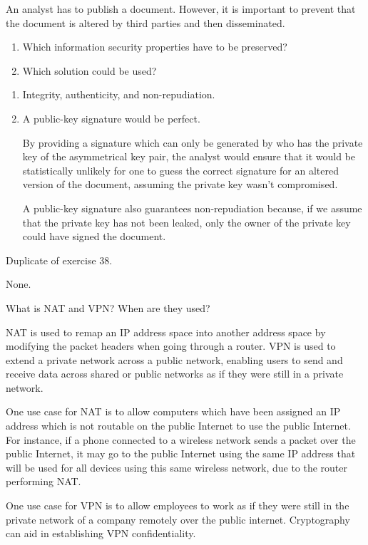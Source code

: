 \begin{Exercise}
An analyst has to publish a document.
However, it is important to prevent that the document is altered by third parties and then disseminated.
\begin{enumerate}
\item Which information security properties have to be preserved?
\item Which solution could be used?
\end{enumerate}
\end{Exercise}
\begin{Answer}
\begin{enumerate}
\item Integrity, authenticity, and non-repudiation.
\item A public-key signature would be perfect.

By providing a signature which can only be generated by who has the private key of the asymmetrical key pair, the analyst would ensure that it would be statistically unlikely for one to guess the correct signature for an altered version of the document, assuming the private key wasn't compromised.

A public-key signature also guarantees non-repudiation because, if we assume that the private key has not been leaked, only the owner of the private key could have signed the document.
\end{enumerate}
\end{Answer}

\begin{Exercise}
Duplicate of exercise 38.
\end{Exercise}
\begin{Answer}
None.
\end{Answer}

\begin{Exercise}
What is NAT and VPN? When are they used?
\end{Exercise}
\begin{Answer}
NAT is used to remap an IP address space into another address space by modifying the packet headers when going through a router.
VPN is used to extend a private network across a public network, enabling users to send and receive data across shared or public networks as if they were still in a private network.

One use case for NAT is to allow computers which have been assigned an IP address which is not routable on the public Internet to use the public Internet.
For instance, if a phone connected to a wireless network sends a packet over the public Internet, it may go to the public Internet using the same IP address that will be used for all devices using this same wireless network, due to the router performing NAT.

One use case for VPN is to allow employees to work as if they were still in the private network of a company remotely over the public internet.
Cryptography can aid in establishing VPN confidentiality.
\end{Answer}

